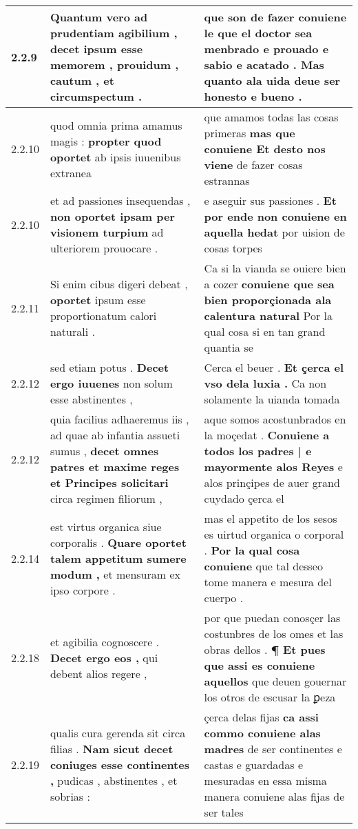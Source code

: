 \begin{tabular}{|p{1cm}|p{6.5cm}|p{6.5cm}|}
2.2.9 & Quantum vero ad prudentiam agibilium , \textbf{ decet ipsum esse memorem , } prouidum , cautum , et circumspectum . & que son de fazer \textbf{ conuiene le que el doctor sea menbrado e prouado e sabio e acatado . } Mas quanto ala uida deue ser honesto e bueno . \\\hline
2.2.10 & quod omnia prima amamus magis : \textbf{ propter quod oportet } ab ipsis iuuenibus extranea & que amamos todas las cosas primeras \textbf{ mas que conuiene Et desto nos viene } de fazer cosas estrannas \\\hline
2.2.10 & et ad passiones insequendas , \textbf{ non oportet ipsam per visionem turpium } ad ulteriorem prouocare . & e aseguir sus passiones . \textbf{ Et por ende non conuiene en aquella hedat } por uision de cosas torpes \\\hline
2.2.11 & Si enim cibus digeri debeat , \textbf{ oportet } ipsum esse proportionatum calori naturali . & Ca si la vianda se ouiere bien a cozer \textbf{ conuiene que sea bien proporçionada ala calentura natural } Por la qual cosa si en tan grand quantia se \\\hline
2.2.12 & sed etiam potus . \textbf{ Decet ergo iuuenes } non solum esse abstinentes , & Cerca el beuer . \textbf{ Et çerca el vso dela luxia . } Ca non solamente la uianda tomada \\\hline
2.2.12 & quia facilius adhaeremus iis , ad quae ab infantia assueti sumus , \textbf{ decet omnes patres et maxime reges et Principes solicitari } circa regimen filiorum , & aque somos acostunbrados en la moçedat . \textbf{ Conuiene a todos los padres | e mayormente alos Reyes } e alos prinçipes de auer grand cuydado çerca el \\\hline
2.2.14 & est virtus organica siue corporalis . \textbf{ Quare oportet talem appetitum sumere modum , } et mensuram ex ipso corpore . & mas el appetito de los sesos es uirtud organica o corporal . \textbf{ Por la qual cosa conuiene } que tal desseo tome manera e mesura del cuerpo . \\\hline
2.2.18 & et agibilia cognoscere . \textbf{ Decet ergo eos , } qui debent alios regere , & por que puedan conosçer las costunbres de los omes et las obras dellos . \textbf{ ¶ Et pues que assi es conuiene aquellos } que deuen gouernar los otros de escusar la ꝑeza \\\hline
2.2.19 & qualis cura gerenda sit circa filias . \textbf{ Nam sicut decet coniuges esse continentes , } pudicas , abstinentes , et sobrias : & çerca delas fijas \textbf{ ca assi commo conuiene alas madres } de ser continentes e castas e guardadas e mesuradas en essa misma manera conuiene alas fijas de ser tales \\\hline

\end{tabular}
